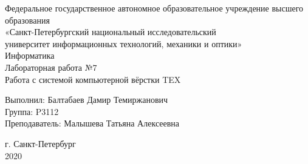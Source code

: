 \begin{center}
Федеральное государственное автономное образовательное учреждение высшего  \\
образования \\
«Санкт-Петербургский национальный исследовательский \\
университет информационных технологий, механики и оптики»\\
\vspace{1cm}
Информатика \\ 
\vspace{5cm}
Лабораторная работа №7 \\
Работа с системой компьютерной вёрстки TEX 
\vspace{5cm}
\end{center}
\begin{flushright}
Выполнил: Балтабаев Дамир Темиржанович \\
Группа: P3112 \\
Преподаватель: Малышева Татьяна Алексеевна \\
\end{flushright}
\vfill
\begin{center}
г. Санкт-Петербург \\ 
2020 \\
\end{center}
